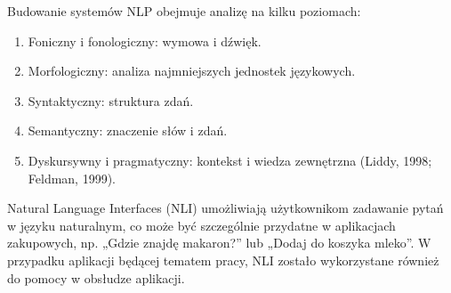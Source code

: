 Budowanie systemów NLP obejmuje analizę na kilku poziomach:
\begin{enumerate}
    \item Foniczny i fonologiczny: wymowa i dźwięk.
    \item Morfologiczny: analiza najmniejszych jednostek językowych.
    \item Syntaktyczny: struktura zdań.
    \item Semantyczny: znaczenie słów i zdań.
    \item Dyskursywny i pragmatyczny: kontekst i wiedza zewnętrzna (Liddy, 1998; Feldman, 1999). \cite{Chowdhary2020}
\end{enumerate}

Natural Language Interfaces (NLI) umożliwiają użytkownikom zadawanie pytań w języku naturalnym, co może być szczególnie przydatne w aplikacjach zakupowych, np. „Gdzie znajdę makaron?” lub „Dodaj do koszyka mleko”. W przypadku aplikacji będącej tematem pracy, NLI zostało wykorzystane również do pomocy w obsłudze aplikacji.
